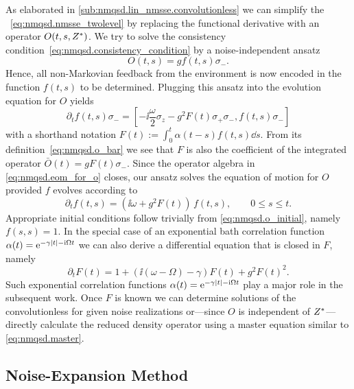 As elaborated in \autoref{sub:nmqsd.lin_nmsse.convolutionless} we can simplify the \NMSSE~\ref{eq:nmqsd.nmsse_twolevel} by replacing the functional derivative with an operator $O(t, s, {Z}^*)$.
We try to solve the consistency condition~\ref{eq:nmqsd.consistency_condition} by a noise-independent ansatz
\begin{equation}
  O(t, s) = g f(t, s) \sigma_-.
  \label{eq:nmqsd.o_ansatz}
\end{equation}
Hence, all non-Markovian feedback from the environment is now encoded in the function $f(t, s)$ to be determined.
Plugging this ansatz into the evolution equation for $O$ yields
\begin{equation}
  \partial_t f(t, s) \sigma_- = \left[-\ii \frac{\omega}{2} \sigma_z - g^2 F(t) \sigma_+\sigma_-, f(t, s) \sigma_-\right]
  \label{eq:nmqsd.eom_for_o}
\end{equation}
with a shorthand notation $F(t) := \int_0^t \alpha(t-s) f(t, s) \dd s$.
From its definition~\ref{eq:nmqsd.o_bar} we see that $F$ is also the coefficient of the integrated operator $\bar O(t) = g F(t) \sigma_-$.
Since the operator algebra in \autoref{eq:nmqsd.eom_for_o} closes, our ansatz solves the equation of motion for $O$ provided $f$ evolves according to
\begin{equation*}
  \partial_t f(t, s) = \left(\ii \omega + g^2 F(t)\right) \, f(t, s), \qquad 0 \le s \le t.
\end{equation*}
Appropriate initial conditions follow trivially from \autoref{eq:nmqsd.o_initial}, namely $f(s, s) = 1$.
In the special case of an exponential bath correlation function $\alpha(t) = \exp[-\gamma\abs{t} - \ii\Omega t]$ we can also derive a differential equation that is closed in $F$, namely
\begin{equation}
  \partial_t F(t) = 1 + (\ii (\omega - \Omega) - \gamma) F(t) + g^2 F(t)^2.
  \label{eq:nmqsd.twolevel_f}
\end{equation}
Such exponential correlation functions $\alpha(t) = \exp[-\gamma\abs{t} - \ii\Omega t]$ play a major role in the subsequent work.
Once $F$ is known we can determine solutions of the convolutionless \NMSSE for given noise realizations or---since $O$ is independent of ${Z}^*$---directly calculate the reduced density operator using a master equation similar to \autoref{eq:nmqsd.master}.

\subsection{Noise-Expansion Method}
\label{sub:nmqsd.expansion}

